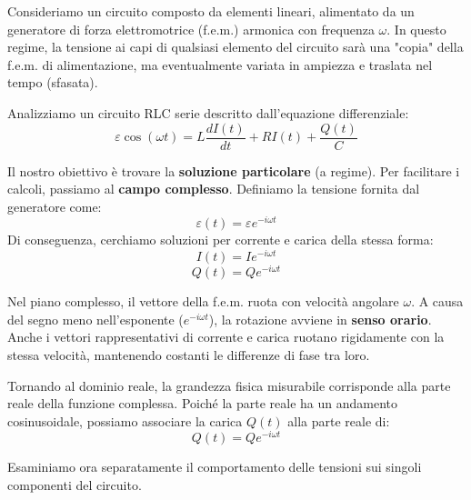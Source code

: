 \documentclass{book}
\begin{document}
Consideriamo un circuito composto da elementi lineari, alimentato da un generatore di forza elettromotrice (f.e.m.) armonica con frequenza $\omega$. In questo regime, la tensione ai capi di qualsiasi elemento del circuito sarà una "copia" della f.e.m. di alimentazione, ma eventualmente variata in ampiezza e traslata nel tempo (sfasata).

Analizziamo un circuito RLC serie descritto dall'equazione differenziale:
$$ \varepsilon \cos(\omega t) = L \frac{dI(t)}{dt} + R I(t) + \frac{Q(t)}{C} $$

Il nostro obiettivo è trovare la \textbf{soluzione particolare} (a regime). Per facilitare i calcoli, passiamo al \textbf{campo complesso}.
Definiamo la tensione fornita dal generatore come:
$$ \varepsilon(t)= \varepsilon e^{-i\omega t} $$
Di conseguenza, cerchiamo soluzioni per corrente e carica della stessa forma:
$$ I(t) = I e^{-i\omega t} $$
$$ Q(t) = Q e^{-i\omega t} $$

Nel piano complesso, il vettore della f.e.m. ruota con velocità angolare $\omega$. A causa del segno meno nell'esponente ($e^{-i\omega t}$), la rotazione avviene in \textbf{senso orario}. Anche i vettori rappresentativi di corrente e carica ruotano rigidamente con la stessa velocità, mantenendo costanti le differenze di fase tra loro.

Tornando al dominio reale, la grandezza fisica misurabile corrisponde alla parte reale della funzione complessa. Poiché la parte reale ha un andamento cosinusoidale, possiamo associare la carica $Q(t)$ alla parte reale di:
$$ Q(t) = Q e^{-i \omega t}$$

Esaminiamo ora separatamente il comportamento delle tensioni sui singoli componenti del circuito.
\end{document}
